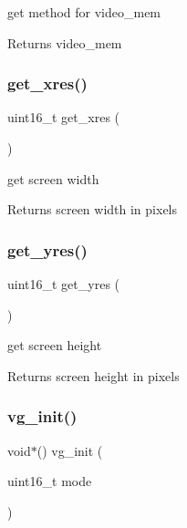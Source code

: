get method for video\+\_\+mem 

\begin{DoxyReturn}{Returns}
video\+\_\+mem 
\end{DoxyReturn}
\mbox{\label{group__Video_ga3dcf2045f1929eb3b370b96715863c4e}} 
\subsubsection{\texorpdfstring{get\+\_\+xres()}{get\_xres()}}
{\footnotesize\ttfamily uint16\+\_\+t get\+\_\+xres (\begin{DoxyParamCaption}{ }\end{DoxyParamCaption})}



get screen width 

\begin{DoxyReturn}{Returns}
screen width in pixels 
\end{DoxyReturn}
\mbox{\label{group__Video_gad20679e2730425e7d0283793bdd6e696}} 
\subsubsection{\texorpdfstring{get\+\_\+yres()}{get\_yres()}}
{\footnotesize\ttfamily uint16\+\_\+t get\+\_\+yres (\begin{DoxyParamCaption}{ }\end{DoxyParamCaption})}



get screen height 

\begin{DoxyReturn}{Returns}
screen height in pixels 
\end{DoxyReturn}
\mbox{\label{group__Video_gaa6c1ff5024cd4d15e476bce487584daa}} 
\subsubsection{\texorpdfstring{vg\+\_\+init()}{vg\_init()}}
{\footnotesize\ttfamily void$\ast$() vg\+\_\+init (\begin{DoxyParamCaption}\item[{uint16\+\_\+t}]{mode }\end{DoxyParamCaption})}



